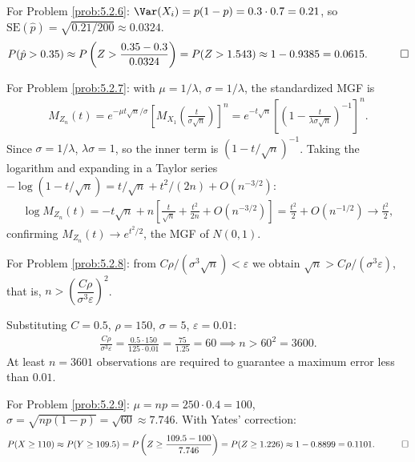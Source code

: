 \begin{solucion}
	\label{sol:5.2.6}
	For Problem \ref{prob:5.2.6}: $\Var(X_i) = p(1-p) = 0.3\cdot 0.7 = 0.21$, so $\text{SE}(\hat p) = \sqrt{0.21/200} \approx 0.0324$.
	\begin{align*}
		P(\hat p > 0.35) \approx P\left(Z > \frac{0.35-0.3}{0.0324}\right) = P(Z > 1.543) \approx 1-0.9385 = 0.0615. \quad \qedhere
	\end{align*}
\end{solucion}

\begin{solucion}
	\label{sol:5.2.7}
	For Problem \ref{prob:5.2.7}: with $\mu=1/\lambda$, $\sigma=1/\lambda$, the standardized MGF is
	\begin{align*}
		M_{Z_n}(t) = e^{-\mu t\sqrt n/\sigma}\left[M_{X_1}\!\left(\frac{t}{\sigma\sqrt n}\right)\right]^n
		= e^{-t\sqrt n}\left[\left(1-\frac{t}{\lambda\sigma\sqrt n}\right)^{-1}\right]^n.
	\end{align*}
	Since $\sigma=1/\lambda$, $\lambda\sigma=1$, so the inner term is $(1-t/\sqrt n)^{-1}$. Taking the logarithm and expanding in a Taylor series $-\log(1-t/\sqrt n) = t/\sqrt n + t^2/(2n) + O(n^{-3/2})$:
	\begin{align*}
		\log M_{Z_n}(t) = -t\sqrt n + n\left[\frac{t}{\sqrt n}+\frac{t^2}{2n}+O(n^{-3/2})\right] = \frac{t^2}{2}+O(n^{-1/2}) \longrightarrow \frac{t^2}{2},
	\end{align*}
	confirming $M_{Z_n}(t)\to e^{t^2/2}$, the MGF of $N(0,1)$. \quad \qedhere
\end{solucion}

\begin{solucion}
	\label{sol:5.2.8}
	For Problem \ref{prob:5.2.8}: from $C\rho/(\sigma^3\sqrt n) < \varepsilon$ we obtain $\sqrt n > C\rho/(\sigma^3\varepsilon)$, that is, $n > \left(\dfrac{C\rho}{\sigma^3\varepsilon}\right)^2$.

	Substituting $C=0.5$, $\rho=150$, $\sigma=5$, $\varepsilon=0.01$:
	\begin{align*}
		\frac{C\rho}{\sigma^3\varepsilon} = \frac{0.5\cdot 150}{125\cdot 0.01} = \frac{75}{1.25} = 60 \implies n > 60^2 = 3600.
	\end{align*}
	At least $n=3601$ observations are required to guarantee a maximum error less than $0.01$. \quad \qedhere
\end{solucion}

\begin{solucion}
	\label{sol:5.2.9}
	For Problem \ref{prob:5.2.9}: $\mu = np = 250\cdot 0.4 = 100$, $\sigma=\sqrt{np(1-p)}=\sqrt{60}\approx 7.746$. With Yates' correction:
	\begin{align*}
		P(X\ge 110) \approx P(Y\ge 109.5) = P\left(Z \ge \frac{109.5-100}{7.746}\right) = P(Z\ge 1.226) \approx 1-0.8899 = 0.1101. \quad \qedhere
	\end{align*}
\end{solucion}

